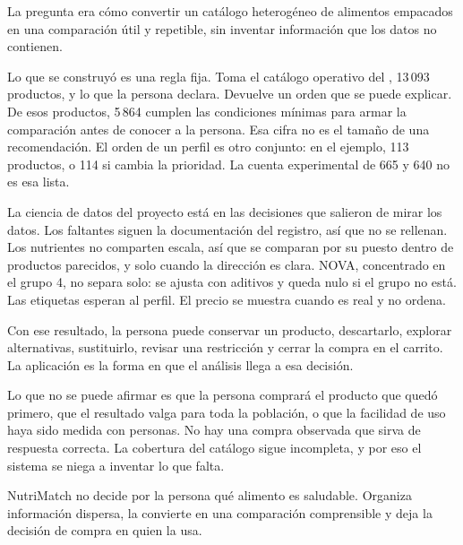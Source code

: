 La pregunta era cómo convertir un catálogo heterogéneo de alimentos empacados en una comparación útil y repetible, sin inventar información que los datos no contienen.

Lo que se construyó es una regla fija. Toma el catálogo operativo del \corte, 13\,093 productos, y lo que la persona declara. Devuelve un orden que se puede explicar. De esos productos, 5\,864 cumplen las condiciones mínimas para armar la comparación antes de conocer a la persona. Esa cifra no es el tamaño de una recomendación. El orden de un perfil es otro conjunto: en el ejemplo, 113 productos, o 114 si cambia la prioridad. La cuenta experimental de 665 y 640 no es esa lista.

La ciencia de datos del proyecto está en las decisiones que salieron de mirar los datos. Los faltantes siguen la documentación del registro, así que no se rellenan. Los nutrientes no comparten escala, así que se comparan por su puesto dentro de productos parecidos, y solo cuando la dirección es clara. NOVA, concentrado en el grupo 4, no separa solo: se ajusta con aditivos y queda nulo si el grupo no está. Las etiquetas esperan al perfil. El precio se muestra cuando es real y no ordena.

Con ese resultado, la persona puede conservar un producto, descartarlo, explorar alternativas, sustituirlo, revisar una restricción y cerrar la compra en el carrito. La aplicación es la forma en que el análisis llega a esa decisión.

Lo que no se puede afirmar es que la persona comprará el producto que quedó primero, que el resultado valga para toda la población, o que la facilidad de uso haya sido medida con personas. No hay una compra observada que sirva de respuesta correcta. La cobertura del catálogo sigue incompleta, y por eso el sistema se niega a inventar lo que falta.

NutriMatch no decide por la persona qué alimento es saludable. Organiza información dispersa, la convierte en una comparación comprensible y deja la decisión de compra en quien la usa.
